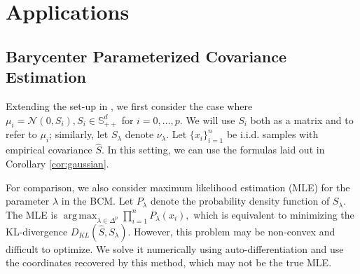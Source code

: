 \documentclass[nohyperref]{article}
\DeclareMathOperator*{\argmax}{arg\,max}
\theoremstyle{definition}
\begin{document}
\section{Applications \label{sec:emp_res}}


\subsection{Barycenter Parameterized Covariance Estimation}


Extending the set-up in \cite{musolas2021geodesically}, we first consider the case where $\mu_i = \mathcal{N}(0,S_i), S_i \in \mathbb{S}^d_{++}$  for $i=0,\dots,p$.  We will use $S_i$ both as a matrix and to refer to $\mu_i$; similarly, let $S_{\lambda}$ denote $\nu_{\lambda}$. Let $\{x_i\}_{i=1}^n$ be i.i.d. samples with empirical covariance $\hat{S}$. In this setting, we can use the formulas laid out in Corollary \ref{cor:gaussian}.

For comparison, we also consider maximum likelihood estimation (MLE) for the parameter $\lambda$ in the BCM. Let $P_{\lambda}$ denote the probability density function of $S_{\lambda}$. The MLE is $\argmax_{\lambda \in \Delta^p} \prod_{i=1}^n P_{\lambda}(x_i),$ which is equivalent to minimizing the KL-divergence $D_{KL}(\hat{S},S_{\lambda})$. However, this problem may be non-convex and difficult to optimize. We solve it numerically using auto-differentiation \citep{bartholomew2000automatic} and use the coordinates recovered by this method, which may not be the true MLE.
\end{document}

